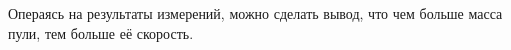Операясь на результаты измерений, можно сделать вывод, что чем больше масса пули, тем больше её скорость.